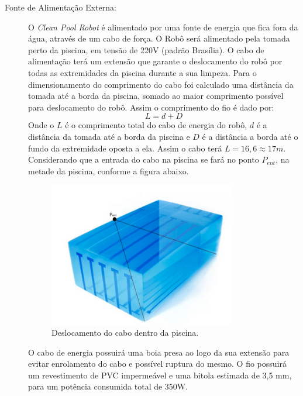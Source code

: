 \begin{description}
\item[Fonte de Alimentação Externa:] O \textit{Clean Pool Robot} é alimentado por
uma fonte de energia que fica fora da água, através de um cabo de força. O Robô
será alimentado pela tomada perto da piscina, em tensão de 220V (padrão Brasília).
O cabo de alimentação terá um extensão que garante o deslocamento do robô por todas
as extremidades da piscina durante a sua limpeza. Para o dimensionamento do
comprimento do cabo foi calculado uma distância da tomada até a borda da piscina,
somado ao maior comprimento possível para deslocamento do robô. Assim o comprimento
do fio é dado por:
\begin{displaymath}
  L= d + D
\end{displaymath}
Onde o $L$ é o comprimento total do cabo de energia do robô, $d$ é a distância da
tomada até a borda da piscina e $D$ é a distância a borda até o fundo da
extremidade oposta a ela. Assim o cabo terá $L = 16,6 \approx 17m$. Considerando que
a entrada do cabo na piscina se fará no ponto $P_ {ent}$, na metade da piscina,
conforme a figura abaixo.
\par
\begin{figure}[h]
  \centering
  \includegraphics[width=0.8\textwidth]{figures/cable-desloc.png}
  \caption{Deslocamento do cabo dentro da piscina.}
  \label{fig:cable-desloc}
\end{figure}
\FloatBarrier
\par
O cabo de energia possuirá uma boia presa ao logo da sua extensão para evitar
enrolamento do cabo e possível ruptura do mesmo. O fio possuirá um revestimento
de PVC impermeável e uma bitola estimada de 3,5 mm, para um potência consumida
total de 350W.


\end{description}
